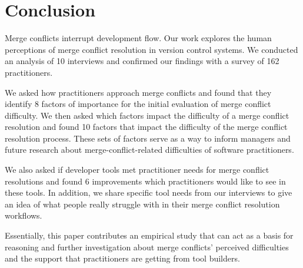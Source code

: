 \section{Conclusion}\label{conclusion}
Merge conflicts interrupt development flow.
Our work explores the human perceptions of merge conflict resolution in version control systems. We conducted an analysis of 10 interviews and confirmed our findings with a survey of 162 practitioners.

We asked how practitioners approach merge conflicts and found that they identify 8 factors of importance for the initial evaluation of merge conflict difficulty. 
We then asked which factors impact the difficulty of a merge conflict resolution and found 10 factors that impact the difficulty of the merge conflict resolution process. 
These sets of factors serve as a way to inform managers and future research about merge-conflict-related difficulties of software practitioners.

We also asked if developer tools met practitioner needs for merge conflict resolutions and found 6 improvements which practitioners would like to see in these tools. 
In addition, we share specific tool needs from our interviews to give an idea of what people really struggle with in their merge conflict resolution workflows.

Essentially, this paper contributes an empirical study that can act as a basis for reasoning and further investigation about merge conflicts' perceived difficulties and the support that practitioners are getting from tool builders. 